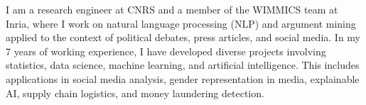 \documentclass[10pt,a4paper,ragged2e,withhyper]{altacv}
\begin{document}

\makecvheader

\begin{justify}
\vspace{-1em}
I am a research engineer at CNRS and a member of the WIMMICS team at Inria, where I work on natural language processing (NLP) and argument mining applied to the context of political debates, press articles, and social media.
In my 7 years of working experience, I have developed diverse projects involving statistics, data science, machine learning, and artificial intelligence.
This includes applications in social media analysis, gender representation in media, explainable AI, supply chain logistics, and money laundering detection.
\end{justify}
\end{document}
